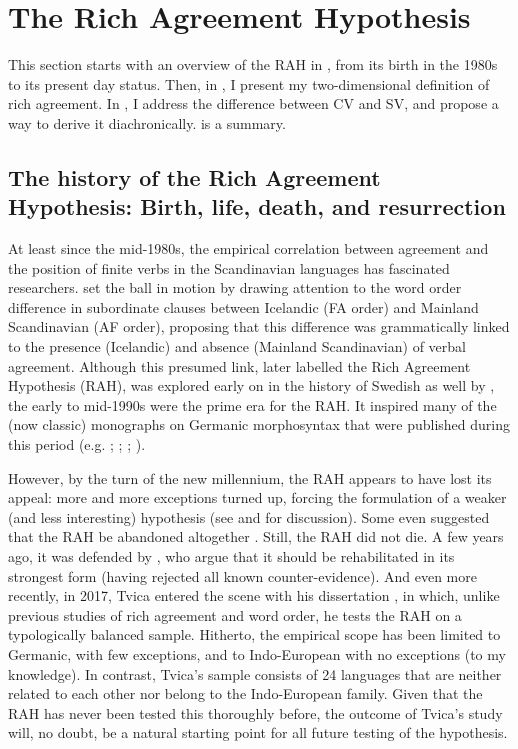 \documentclass[output=paper,colorlinks,citecolor=brown,draft,draftmode]{langscibook}
\begin{document}
\section{The Rich Agreement Hypothesis }\label{sec:petzell:4}


This section starts with an overview of the RAH in , from its birth in the 1980s to its present day status. Then, in , I present my two-dimensional definition of rich agreement. In , I address the difference between CV and SV, and propose a way to derive it diachronically.  is a summary.


\subsection{The history of the Rich Agreement Hypothesis: Birth, life, death, and resurrection}\label{sec:petzell:4.1}
\begin{sloppypar}
At least since the mid-1980s, the empirical correlation between agreement and the position of finite verbs in the Scandinavian languages has fascinated researchers. \citet{Kosmeijer1986} set the ball in motion by drawing attention to the word order difference in subordinate clauses between Icelandic (FA order) and Mainland Scandinavian (AF order), proposing that this difference was grammatically linked to the presence (Icelandic) and absence (Mainland Scandinavian) of verbal agreement. Although this presumed link, later labelled the Rich Agreement Hypothesis (RAH), was explored early on in the history of Swedish as well by \citet{Platzack1988emergence}, the early to mid-1990s were the prime era for the RAH. It inspired many of the (now classic) monographs on Germanic morphosyntax that were published during this period (e.g. \citealt{Falk1993}; \citealt{Rohrbacher1994}; \citealt{Vikner1994}; \citealt{HolmbergPlatzack1995}). 
\end{sloppypar}


However, by the turn of the new millennium, the RAH appears to have lost its appeal: more and more exceptions turned up, forcing the formulation of a weaker (and less interesting) hypothesis (see \citealt{BobaljikThrainsson1998} and \citealt{Sundquist2003} for discussion). Some even suggested that the RAH be abandoned altogether \citep{WiklundEtAl2007}. Still, the RAH did not die. A few years ago, it was defended by \citet{KoenemanZeijlstra2014}, who argue that it should be rehabilitated in its strongest form (having rejected all known counter-evidence). And even more recently, in 2017, Tvica entered the scene with his dissertation \citep{Tvica2017}, in which, unlike previous studies of rich agreement and word order, he tests the RAH on a typologically balanced sample. Hitherto, the empirical scope has been limited to Germanic, with few exceptions, and to Indo-European with no exceptions (to my knowledge). In contrast, Tvica’s sample consists of 24 languages that are neither related to each other nor belong to the Indo-European family. Given that the RAH has never been tested this thoroughly before, the outcome of Tvica’s study will, no doubt, be a natural starting point for all future testing of the hypothesis. 
\end{document}
